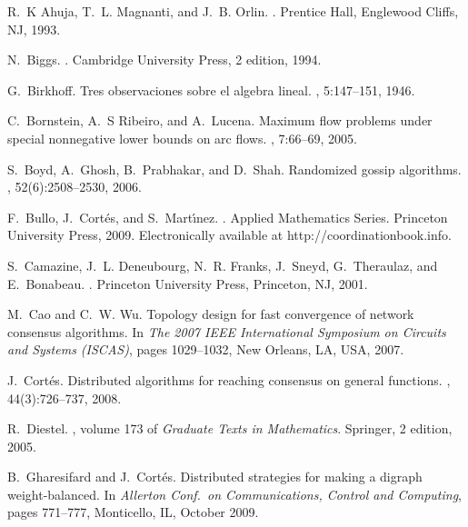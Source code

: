 \documentclass[final]{siamltex}
\begin{document}
\begin{thebibliography}{10}

R.~K Ahuja, T.~L. Magnanti, and J.~B. Orlin.
.
\newblock Prentice Hall, Englewood Cliffs, NJ, 1993.

N.~Biggs.
.
\newblock Cambridge University Press, 2 edition, 1994.

G.~Birkhoff.
\newblock Tres observaciones sobre el algebra lineal.
, 5:147--151,
  1946.

C.~Bornstein, A.~S Ribeiro, and A.~Lucena.
\newblock Maximum flow problems under special nonnegative lower bounds on arc
  flows.
, 7:66--69, 2005.

S.~Boyd, A.~Ghosh, B.~Prabhakar, and D.~Shah.
\newblock Randomized gossip algorithms.
, 52(6):2508--2530,
  2006.

F.~Bullo, J.~Cort\'es, and S.~Mart{\'\i}nez.
.
\newblock Applied Mathematics Series. Princeton University Press, 2009.
\newblock Electronically available at http:/$\!$/coordinationbook.info.

S.~Camazine, J.~L. Deneubourg, N.~R. Franks, J.~Sneyd, G.~Theraulaz, and
  E.~Bonabeau.
.
\newblock Princeton University Press, Princeton, NJ, 2001.

M.~Cao and C.~W. Wu.
\newblock Topology design for fast convergence of network consensus algorithms.
\newblock In {\em The 2007 IEEE International Symposium on Circuits and Systems
  (ISCAS)}, pages 1029--1032, New Orleans, LA, USA, 2007.

J.~Cort{\'e}s.
\newblock Distributed algorithms for reaching consensus on general functions.
, 44(3):726--737, 2008.

R.~Diestel.
, volume 173 of {\em Graduate Texts in
  Mathematics}.
\newblock Springer, 2 edition, 2005.

B.~Gharesifard and J.~Cort\'es.
\newblock Distributed strategies for making a digraph weight-balanced.
\newblock In {\em Allerton Conf.\ on Communications, Control and Computing},
  pages 771--777, Monticello, IL, October 2009.


\end{thebibliography}
\end{document}
